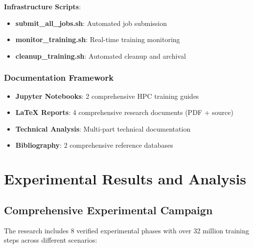 \documentclass[12pt,a4paper]{article}
\begin{document}
\textbf{Infrastructure Scripts}:
\begin{itemize}
    \item \textbf{submit\_all\_jobs.sh}: Automated job submission
    \item \textbf{monitor\_training.sh}: Real-time training monitoring
    \item \textbf{cleanup\_training.sh}: Automated cleanup and archival
\end{itemize}

\subsubsection{Documentation Framework}
\begin{itemize}
    \item \textbf{Jupyter Notebooks}: 2 comprehensive HPC training guides
    \item \textbf{LaTeX Reports}: 4 comprehensive research documents (PDF + source)
    \item \textbf{Technical Analysis}: Multi-part technical documentation
    \item \textbf{Bibliography}: 2 comprehensive reference databases
\end{itemize}

\section{Experimental Results and Analysis}

\subsection{Comprehensive Experimental Campaign}

The research includes 8 verified experimental phases with over 32 million training steps across different scenarios:
\end{document}
